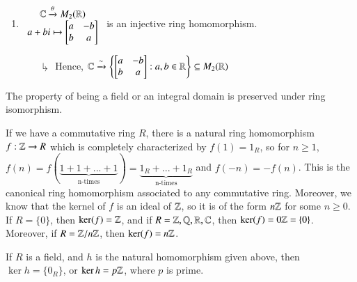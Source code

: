 \documentclass[12pt, a4paper, oneside, openright, titlepage]{book}
\begin{document}
\begin{eg}
\begin{enumerate}
\begin{proof}
            Hence, we find that $\phi$ is a ring homomorphism. Finally, if $[k]_p \in \ker(\phi)$, then $k\;\vert\;p$, which implies $[k]_p = [0]_p$ so $\ker(\phi) = \{[0]_p\}$, and since both sets are finite (and of the same order) we conclude that $\phi$ is a bijection. Therefore, $\phi$ is a ring isomorphism so $R \cong \F_p$, as claimed.
        \end{proof}
        \item $\begin{array}{c} \mathbb C\xrightarrow{\theta}M_2(\mathbb R) \\ a+bi\mapsto \begin{bmatrix} a & -b \\ b & a\end{bmatrix} \end{array}$ is an injective ring homomorphism.
        \begin{enumerate}
            \item[$\drsh$] Hence, $\mathbb C \xrightarrow{\sim} \left\{\begin{bmatrix} a & -b \\ b & a\end{bmatrix}:a,b \in \mathbb R\right\}\subseteq M_2(\mathbb R)$ 
        \end{enumerate}
    \end{enumerate}
\end{eg}

\begin{rmk}
    The property of being a field or an integral domain is preserved under ring isomorphism.
\end{rmk}


\begin{rmk}
        If we have a commutative ring $R$, there is a natural ring homomorphism $f:\mathbb Z\rightarrow R$ which is completely characterized by $f(1) = 1_R$, so for $n \geq 1$, $f(n) = f(\underbrace{1+1+...+1}_{\text{n-times}}) = \underbrace{1_R+...+1_R}_{\text{n-times}}$ and $f(-n) = -f(n)$. This is the canonical ring homomorphism associated to any commutative ring. Moreover, we know that the kernel of $f$ is an ideal of $\mathbb Z$, so it is of the form $n\mathbb Z$ for some $n \geq 0$. If $R = \{0\}$, then $\ker(f) =\mathbb Z$, and if $R = \mathbb Z,\mathbb Q,\mathbb R,\mathbb C$, then $\ker(f) = 0\mathbb Z = \{0\}$. Moreover, if $R= \mathbb Z/n\mathbb Z$, then $\ker(f) = n\mathbb Z$.
\end{rmk}

\begin{rmk}
        If $R$ is a field, and $h$ is the natural homomorphism given above, then $\ker h = \{0_R\}$, or $\ker h = p\mathbb Z$, where $p$ is prime.
\end{rmk}
\end{document}
